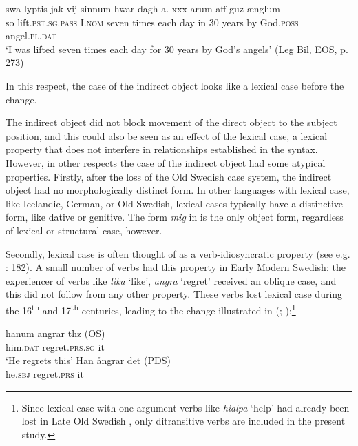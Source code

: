 \documentclass[output=paper]{langscibook}
\begin{document}
\ex\label{ex:falk:4b}
\gll swa  lyptis                                        jak               vij    sinnum  hwar  dagh  a.  xxx  arum  aff guz         ænglum\\
      so    lift.\textsc{pst}.\textsc{sg}.\textsc{pass}  I.\textsc{nom}  seven  times    each  day  in   30  years  by  God.\textsc{poss} angel.\textsc{pl.dat}\\
\glt ‘I was lifted seven times each day for 30 years by God’s angels’ (Leg Bil, EOS, p. 273)
    \z
    \z

In this respect, the case of the indirect object looks like a lexical case before the change. 


The indirect object did not block movement of the direct object to the subject position, and this could also be seen as an effect of the lexical case, a lexical property that does not interfere in relationships established in the syntax. However, in other respects the case of the indirect object had some atypical properties. Firstly, after the loss of the Old Swedish case system, the indirect object had no morphologically distinct form. In other languages with lexical case, like Icelandic, German, or Old Swedish, lexical cases typically have a distinctive form, like dative or genitive. The form \textit{mig} in  is the only object form, regardless of lexical or structural case, however.



Secondly, lexical case is often thought of as a verb-idiosyncratic property (see e.g. \citealt{Thrainsson2007}: 182). A small number of verbs had this property in Early Modern Swedish: the experiencer of verbs like \textit{lika} ‘like’, \textit{angra} ‘regret’ received an oblique case, and this did not follow from any other property. These verbs lost lexical case during the 16\textsuperscript{th} and 17\textsuperscript{th} centuries, leading to the change illustrated in  (\citealt{Lindqvist1912}; \citealt{Falk1997}):\footnote{Since lexical case with one argument verbs like \textit{hialpa} ‘help’ had already been lost in Late Old Swedish \citep{Falk1995}, only ditransitive verbs are included in the present study.}


\ea%
    \label{ex:falk:5}
\ea
\gll hanum    angrar        thz    (OS)\\
      him.\textsc{dat} regret.\textsc{prs.sg}  it\\
\glt ‘He regrets this’
\ex
\gll Han    ångrar    det     (PDS)\\
      he.\textsc{sbj}  regret.\textsc{prs}  it\\
\z
\z
\end{document}
